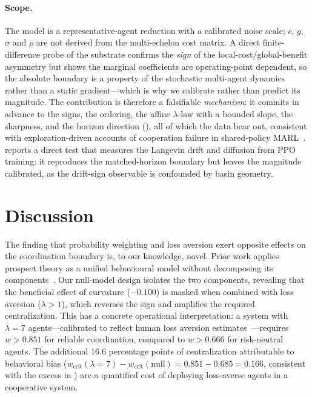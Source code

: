 \documentclass[11pt]{article}
\newcommand{\wcrit}{w_{\mathrm{crit}}}
\begin{document}
\paragraph{Scope.} The model is a representative-agent reduction with a
calibrated noise scale; $c$, $g$, $\sigma$ and $\rho$ are not derived from
the multi-echelon cost matrix. A direct finite-difference probe of the
substrate confirms the \emph{sign} of the local-cost/global-benefit
asymmetry but shows the marginal coefficients are operating-point dependent,
so the absolute boundary is a property of the stochastic multi-agent
dynamics rather than a static gradient---which is why we calibrate rather
than predict its magnitude. The contribution is therefore a falsifiable
\emph{mechanism}: it commits in advance to the signs, the ordering, the
affine $\lambda$-law with a bounded slope, the sharpness, and the horizon
direction (), all of which the data bear out, consistent
with exploration-driven accounts of cooperation failure in shared-policy
MARL~\citep{weng2026}.  reports a direct test that
measures the Langevin drift and diffusion from PPO training: it reproduces
the matched-horizon boundary but leaves the magnitude calibrated, as the
drift-sign observable is confounded by basin geometry.

\section{Discussion}
\label{sec:discussion}

The finding that probability weighting and loss aversion exert opposite
effects on the coordination boundary is, to our knowledge, novel.
Prior work applies prospect theory as a unified behavioural model without
decomposing its components~\citep{lalmohammed2025,anon2024risk}.
Our null-model design isolates the two components, revealing that the
beneficial effect of curvature ($-0.100$) is masked when combined with
loss aversion ($\lambda{>}1$), which reverses the sign and amplifies the
required centralization.
This has a concrete operational interpretation: a system with $\lambda{=}7$
agents---calibrated to reflect human loss aversion
estimates~\citep{tversky1992}---requires $w > 0.851$ for reliable
coordination, compared to $w > 0.666$ for risk-neutral agents.
The additional 16.6 percentage points of centralization attributable to
behavioral bias ($\wcrit(\lambda{=}7) - \wcrit(\text{null}) =
0.851 - 0.685 = 0.166$, consistent with the excess in
) are a quantified cost of deploying loss-averse
agents in a cooperative system.
\end{document}
